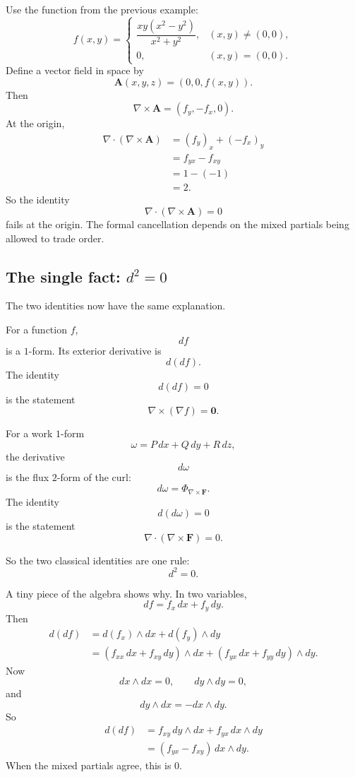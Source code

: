 \begin{example}
Use the function from the previous example:
\[
    f(x,y)=
    \begin{cases}
    \dfrac{xy(x^2-y^2)}{x^2+y^2}, & (x,y)\ne(0,0),\\[2mm]
    0, & (x,y)=(0,0).
    \end{cases}
\]
Define a vector field in space by
\[
    \mathbf A(x,y,z)=(0,0,f(x,y)).
\]
Then
\[
    \nabla\times\mathbf A=(f_y,-f_x,0).
\]
At the origin,
\[
\begin{aligned}
\nabla\cdot(\nabla\times\mathbf A)
&=
(f_y)_x+(-f_x)_y\\
&=
f_{yx}-f_{xy}\\
&=
1-(-1)\\
&=
2.
\end{aligned}
\]
So the identity
\[
    \nabla\cdot(\nabla\times\mathbf A)=0
\]
fails at the origin.  The formal cancellation depends on the mixed partials being
allowed to trade order.
\end{example}

\subsection{The single fact: \texorpdfstring{\(d^2=0\)}{d squared is zero}}

The two identities now have the same explanation.

For a function \(f\),
\[
    df
\]
is a \(1\)-form.  Its exterior derivative is
\[
    d(df).
\]
The identity
\[
    d(df)=0
\]
is the statement
\[
    \nabla\times(\nabla f)=\mathbf 0.
\]

For a work \(1\)-form
\[
    \omega=P\,dx+Q\,dy+R\,dz,
\]
the derivative
\[
    d\omega
\]
is the flux \(2\)-form of the curl:
\[
    d\omega=\Phi_{\nabla\times\mathbf F}.
\]
The identity
\[
    d(d\omega)=0
\]
is the statement
\[
    \nabla\cdot(\nabla\times\mathbf F)=0.
\]

So the two classical identities are one rule:
\[
\boxed{
    d^2=0.
}
\]

A tiny piece of the algebra shows why.  In two variables,
\[
    df=f_x\,dx+f_y\,dy.
\]
Then
\[
\begin{aligned}
d(df)
&=
d(f_x)\wedge dx+d(f_y)\wedge dy\\
&=
(f_{xx}\,dx+f_{xy}\,dy)\wedge dx
+
(f_{yx}\,dx+f_{yy}\,dy)\wedge dy.
\end{aligned}
\]
Now
\[
    dx\wedge dx=0,
    \qquad
    dy\wedge dy=0,
\]
and
\[
    dy\wedge dx=-dx\wedge dy.
\]
So
\[
\begin{aligned}
d(df)
&=
f_{xy}\,dy\wedge dx+f_{yx}\,dx\wedge dy\\
&=
(f_{yx}-f_{xy})\,dx\wedge dy.
\end{aligned}
\]
When the mixed partials agree, this is \(0\).

